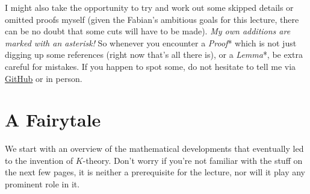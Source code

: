 \documentclass[a4paper, 10pt, oneside, DIV=9, chapterprefix=true, numbers=enddot,bibliography=totoc]{scrbook}
\begin{document}
	I might also take the opportunity to try and work out some skipped details or omitted proofs myself (given the Fabian's ambitious goals for this lecture, there can be no doubt that some cuts will have to be made). \emph{My own additions are marked with an asterisk!} So whenever you encounter a \emph{Proof}* which is not just digging up some references (right now that's all there is), or a \emph{Lemma}*, be extra careful for mistakes. If you happen to spot some, do not hesitate to tell me via \href{https://github.com/FlorianAdler/AlgebraBonn/issues/new}{GitHub} or in person.
	
	
	
	\section{A Fairytale}

	We start with an overview of the mathematical developments that eventually led to the invention of $K$-theory. Don't worry if you're not familiar with the stuff on the next few pages, it is neither a prerequisite for the lecture, nor will it play any prominent role in it.
	
\end{document}
